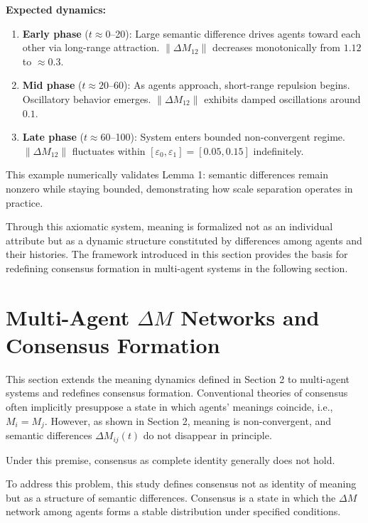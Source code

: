 \documentclass[11pt,a4paper]{article}
\theoremstyle{definition}
\begin{document}
\textbf{Expected dynamics:}
\begin{enumerate}
\item \textbf{Early phase} ($t \approx 0$--20): Large semantic difference drives agents toward each other via long-range attraction. $\|\Delta M_{12}\|$ decreases monotonically from $1.12$ to $\approx 0.3$.

\item \textbf{Mid phase} ($t \approx 20$--60): As agents approach, short-range repulsion begins. Oscillatory behavior emerges. $\|\Delta M_{12}\|$ exhibits damped oscillations around $0.1$.

\item \textbf{Late phase} ($t \approx 60$--100): System enters bounded non-convergent regime. $\|\Delta M_{12}\|$ fluctuates within $[\varepsilon_0, \varepsilon_1] = [0.05, 0.15]$ indefinitely.
\end{enumerate}

This example numerically validates Lemma 1: semantic differences remain nonzero while staying bounded, demonstrating how scale separation operates in practice.

Through this axiomatic system, meaning is formalized not as an individual attribute but as a dynamic structure constituted by differences among agents and their histories. The framework introduced in this section provides the basis for redefining consensus formation in multi-agent systems in the following section.

\section{Multi-Agent $\Delta M$ Networks and Consensus Formation}

This section extends the meaning dynamics defined in Section 2 to multi-agent systems and redefines consensus formation. Conventional theories of consensus often implicitly presuppose a state in which agents' meanings coincide, i.e., $M_i = M_j$. However, as shown in Section 2, meaning is non-convergent, and semantic differences $\Delta M_{ij}(t)$ do not disappear in principle.

Under this premise, consensus as complete identity generally does not hold.

To address this problem, this study defines consensus not as identity of meaning but as a structure of semantic differences. Consensus is a state in which the $\Delta M$ network among agents forms a stable distribution under specified conditions.
\end{document}
